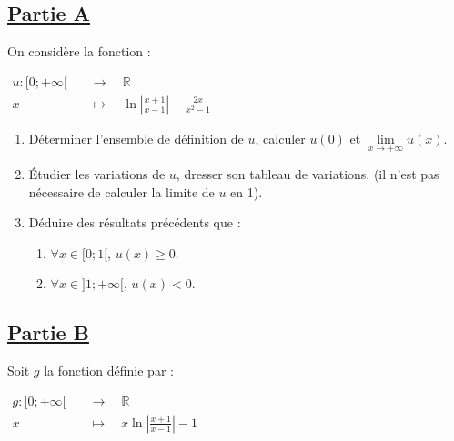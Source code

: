 \subsection*{\underline{\textbf{Partie A}}}

On considère la fonction :

\(
\begin{aligned}
    u : [0; +\infty[ \quad & \longrightarrow \quad \mathbb{R}                                          \\
    x \quad                & \longmapsto \quad \ln \left| \frac{x+1}{x-1} \right| - \frac{2x}{x^2 - 1}
\end{aligned}
\)

\begin{enumerate}
    \item Déterminer l’ensemble de définition de \( u \), calculer \( u(0) \) et \( \lim\limits_{x \to +\infty} u(x) \).
    \item Étudier les variations de \( u \), dresser son tableau de variations. (il n’est pas nécessaire de calculer la limite de \( u \) en 1).
    \item Déduire des résultats précédents que :
          \begin{enumerate}
              \item \( \forall x \in [0;1[ \), \( u(x) \geq 0 \).
              \item \( \forall x \in ]1; +\infty[ \), \( u(x) < 0 \).
          \end{enumerate}
\end{enumerate}

\subsection*{\underline{\textbf{Partie B}}}

Soit \( g \) la fonction définie par :

\(
\begin{aligned}
    g : [0; +\infty[ \quad & \longrightarrow \quad \mathbb{R}                           \\
    x \quad                & \longmapsto \quad x \ln \left| \frac{x+1}{x-1} \right| - 1
\end{aligned}
\)

